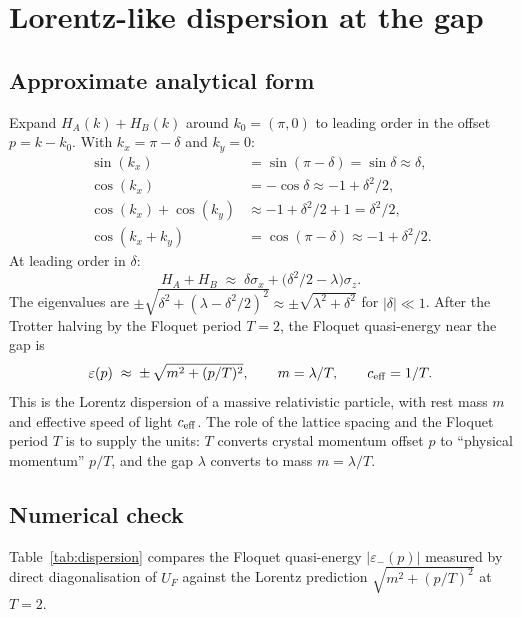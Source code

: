 \documentclass[11pt,a4paper]{article}
\begin{document}
\section{Lorentz-like dispersion at the gap}
\label{sec:dispersion}

\subsection{Approximate analytical form}

Expand $H_A(k) + H_B(k)$ around $k_0 = (\pi, 0)$ to leading
order in the offset $p = k - k_0$. With $k_x = \pi - \delta$
and $k_y = 0$:
\begin{align*}
\sin(k_x) &= \sin(\pi - \delta) = \sin\delta \approx \delta,\\
\cos(k_x) &= -\cos\delta \approx -1 + \delta^2/2,\\
\cos(k_x) + \cos(k_y) &\approx -1 + \delta^2/2 + 1 = \delta^2/2,\\
\cos(k_x + k_y) &= \cos(\pi - \delta) \approx -1 + \delta^2/2.
\end{align*}
At leading order in $\delta$:
\[
H_A + H_B \;\approx\; \delta \sigma_x
+ \big(\delta^2/2 - \lambda\big) \sigma_z.
\]
The eigenvalues are $\pm\sqrt{\delta^2 + (\lambda - \delta^2/2)^2}
\approx \pm \sqrt{\lambda^2 + \delta^2}$ for $|\delta| \ll 1$.
After the Trotter halving by the Floquet period $T = 2$, the
Floquet quasi-energy near the gap is
\begin{equation}
\varepsilon(p) \;\approx\; \pm\,\sqrt{m^2 + (p/T)^2},
\qquad
m = \lambda/T,
\qquad c_{\rm eff} = 1/T.
\label{eq:lorentz_dispersion}
\end{equation}
This is the Lorentz dispersion of a massive relativistic
particle, with rest mass $m$ and effective speed of light
$c_{\rm eff}$. The role of the lattice spacing and the Floquet
period $T$ is to supply the units: $T$ converts crystal
momentum offset $p$ to ``physical momentum'' $p/T$, and the gap
$\lambda$ converts to mass $m = \lambda/T$.

\subsection{Numerical check}

Table~\ref{tab:dispersion} compares the Floquet quasi-energy
$|\varepsilon_-(p)|$ measured by direct diagonalisation
of $U_F$ against the Lorentz prediction
$\sqrt{m^2 + (p/T)^2}$ at $T = 2$.
\end{document}
